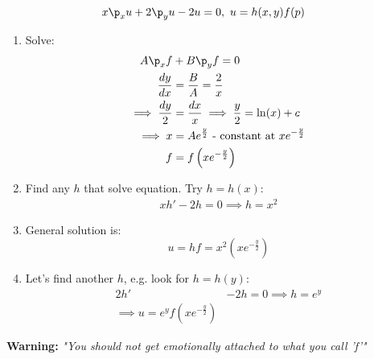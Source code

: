 \documentclass[Maths.tex]{subfiles}
\begin{document}
\begin{example}
\begin{align}
	x\p_xu &+ 2\p_yu - 2u = 0,~ u = h(x,y)f(p)
\end{align}
\begin{enumerate}
	\item Solve:
	\begin{align}
		A\p_xf &+ B\p_yf = 0 \\
		\frac{dy}{dx} &= \frac{B}{A} = \frac{2}{x} \\
		\implies \frac{dy}{2} &= \frac{dx}{x} \implies \frac{y}{2} = \ln(x) + c \\
		\implies x &= Ae^{\frac{y}{2}} \text{ - constant at } xe^{-\frac{y}{2}} \\
		f &= f\left(xe^{-\frac{y}{2}}\right)
	\end{align}
	\item Find any $h$ that solve equation. Try $h = h(x)$:
	\begin{align}
		xh' - 2h = 0 \implies h = x^2
	\end{align}
	\item General solution is:
	\begin{equation}
		u = hf = x^2\left(xe^{-\frac{y}{2}}\right	)
	\end{equation}
	\setcounter{enumi}{1}
	\item Let's find another $h$, e.g. look for $h = h(y)$:
	\begin{align}
		2h' &- 2h = 0 \implies h = e^y \\
		\implies u = e^yf\left(xe^{-\frac{y}{2}}\right)
	\end{align}
\end{enumerate}
\textbf{Warning:} \textit{"You should not get emotionally attached to what you call 'f'"}
\end{example}
\end{document}
